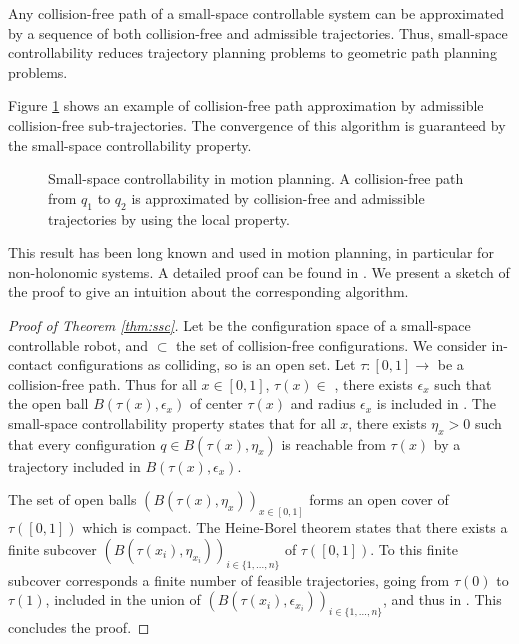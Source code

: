 \begin{theorem}
  \label{thm:ssc}
  Any collision-free path of a small-space controllable system can be approximated
  by a sequence of both collision-free and admissible trajectories. Thus, small-space 
  controllability reduces trajectory planning problems to geometric path planning problems.
\end{theorem}

Figure \ref{fig:ssc2} shows an example of collision-free path
approximation by admissible collision-free sub-trajectories. The
convergence of this algorithm is guaranteed by the small-space
controllability property.

\begin{figure}
  \centering

  

  \caption{Small-space controllability in motion planning. 
    A collision-free path from
    $q_1$ to $q_2$ is approximated by collision-free and admissible
    trajectories by using the local property.
  }
  \label{fig:ssc2}
\end{figure}

This result has been long known and used in motion planning, in
particular for non-holonomic systems. A detailed proof can be found in
\cite{taix-94}. We present a sketch of the proof to give an intuition
about the corresponding algorithm.

\begin{proof}[Proof of Theorem \ref{thm:ssc}]
  Let \cspace\enspace be the configuration space of a small-space
  controllable robot, and \cfree\thinspace $\subset$ \cspace\thinspace
  the set of collision-free configurations. We consider in-contact
  configurations as colliding, so \cfree\thinspace is an open set.
  Let $\tau : [0,1] \rightarrow $ \cfree\thinspace be a collision-free
  path. Thus for all $x \in [0,1]$, $\tau(x) \in $ \cfree\thinspace,
  there exists $\epsilon_x$ such that the open ball
  $B(\tau(x),\epsilon_x)$ of center $\tau(x)$ and radius $\epsilon_x$
  is included in \cfree. The small-space controllability property
  states that for all $x$, there exists $\eta_x > 0$ such that every
  configuration $q \in B(\tau(x),\eta_x)$ is reachable from $\tau(x)$
  by a trajectory included in $B(\tau(x),\epsilon_x)$.

  The set of open balls $\left( B(\tau(x),\eta_x) \right)_{x\in
    [0,1]}$ forms an open cover of $\tau([0,1])$ which is compact. The
  Heine-Borel theorem \cite{fitzpatrick2006advanced} states that there
  exists a finite subcover $\left( B(\tau(x_i),\eta_{x_i})
  \right)_{i\in \{ 1,\dots ,n \}}$ of $\tau([0,1])$. To this finite
  subcover corresponds a finite number of feasible trajectories, going
  from $\tau(0)$ to $\tau(1)$, included in the union of $\left(
  B(\tau(x_i),\epsilon_{x_i}) \right)_{i\in \{ 1,\dots ,n \}}$, and
  thus in \cfree. This concludes the proof.
\end{proof}

